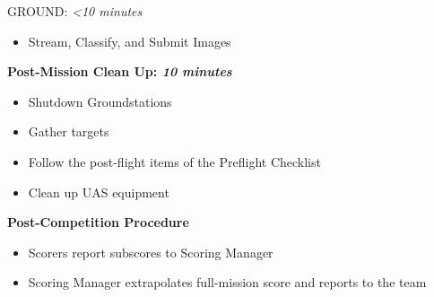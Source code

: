 \documentclass[]{auvsi_doc}
\begin{document}
GROUND: \textit{\textless10 minutes}
\begin{itemize}
	\item Stream, Classify, and Submit Images
\end{itemize}

\hrulefill

\textbf{Post-Mission Clean Up: \textit{10 minutes}}
\begin{itemize}
	\item Shutdown Groundstations
	\item Gather targets
	\item Follow the post-flight items of the Preflight Checklist
	\item Clean up UAS equipment
\end{itemize}

\textbf{Post-Competition Procedure}
\begin{itemize}
	\item Scorers report subscores to Scoring Manager
	\item Scoring Manager extrapolates full-mission score and reports to the team
\end{itemize}
\end{document}
